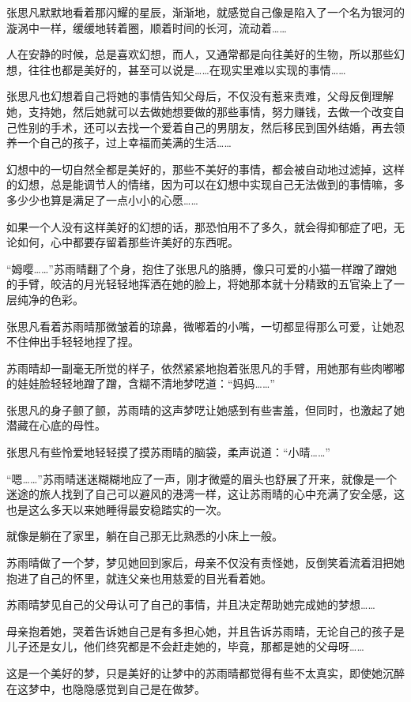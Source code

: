张思凡默默地看着那闪耀的星辰，渐渐地，就感觉自己像是陷入了一个名为银河的漩涡中一样，缓缓地转着圈，顺着时间的长河，流动着……

人在安静的时候，总是喜欢幻想，而人，又通常都是向往美好的生物，所以那些幻想，往往也都是美好的，甚至可以说是……在现实里难以实现的事情……

张思凡也幻想着自己将她的事情告知父母后，不仅没有惹来责难，父母反倒理解她，支持她，然后她就可以去做她想要做的那些事情，努力赚钱，去做一个改变自己性别的手术，还可以去找一个爱着自己的男朋友，然后移民到国外结婚，再去领养一个自己的孩子，过上幸福而美满的生活……

幻想中的一切自然全都是美好的，那些不美好的事情，都会被自动地过滤掉，这样的幻想，总是能调节人的情绪，因为可以在幻想中实现自己无法做到的事情嘛，多多少少也算是满足了一点小小的心愿……

如果一个人没有这样美好的幻想的话，那恐怕用不了多久，就会得抑郁症了吧，无论如何，心中都要存留着那些许美好的东西呢。

“姆嘤……”苏雨晴翻了个身，抱住了张思凡的胳膊，像只可爱的小猫一样蹭了蹭她的手臂，皎洁的月光轻轻地挥洒在她的脸上，将她那本就十分精致的五官染上了一层纯净的色彩。

张思凡看着苏雨晴那微皱着的琼鼻，微嘟着的小嘴，一切都显得那么可爱，让她忍不住伸出手轻轻地捏了捏。

苏雨晴却一副毫无所觉的样子，依然紧紧地抱着张思凡的手臂，用她那有些肉嘟嘟的娃娃脸轻轻地蹭了蹭，含糊不清地梦呓道：“妈妈……”

张思凡的身子颤了颤，苏雨晴的这声梦呓让她感到有些害羞，但同时，也激起了她潜藏在心底的母性。

张思凡有些怜爱地轻轻摸了摸苏雨晴的脑袋，柔声说道：“小晴……”

“嗯……”苏雨晴迷迷糊糊地应了一声，刚才微蹙的眉头也舒展了开来，就像是一个迷途的旅人找到了自己可以避风的港湾一样，这让苏雨晴的心中充满了安全感，这也是这么多天以来她睡得最安稳踏实的一次。

就像是躺在了家里，躺在自己那无比熟悉的小床上一般。

苏雨晴做了一个梦，梦见她回到家后，母亲不仅没有责怪她，反倒笑着流着泪把她抱进了自己的怀里，就连父亲也用慈爱的目光看着她。

苏雨晴梦见自己的父母认可了自己的事情，并且决定帮助她完成她的梦想……

母亲抱着她，哭着告诉她自己是有多担心她，并且告诉苏雨晴，无论自己的孩子是儿子还是女儿，他们终究都是不会赶走她的，毕竟，那都是她的父母呀……

这是一个美好的梦，只是美好的让梦中的苏雨晴都觉得有些不太真实，即使她沉醉在这梦中，也隐隐感觉到自己是在做梦。

